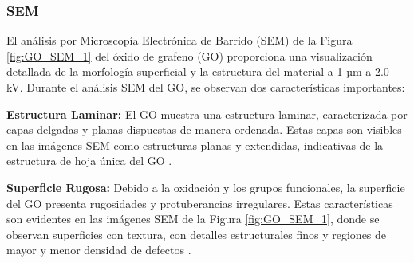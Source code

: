 \documentclass[12pt]{article}
\begin{document}
\subsubsection{SEM}
El análisis por Microscopía Electrónica de Barrido (SEM) de la Figura \ref{fig:GO_SEM_1} del óxido de grafeno (GO) proporciona una visualización detallada de la morfología superficial y la estructura del material a 1 µm a 2.0 kV. Durante el análisis SEM del GO, se observan dos características importantes:\vspace{1em} %

\textbf{Estructura Laminar:} El GO muestra una estructura laminar, caracterizada por capas delgadas y planas dispuestas de manera ordenada. Estas capas son visibles en las imágenes SEM como estructuras planas y extendidas, indicativas de la estructura de hoja única del GO \cite{IEEEreferencias:GO_GOr}.\vspace{1em} %

\textbf{Superficie Rugosa:} Debido a la oxidación y los grupos funcionales, la superficie del GO presenta rugosidades y protuberancias irregulares. Estas características son evidentes en las imágenes SEM de la Figura \ref{fig:GO_SEM_1}, donde se observan superficies con textura, con detalles estructurales finos y regiones de mayor y menor densidad de defectos \cite{IEEEreferencias:GORAMAN}.\vspace{1em} %
\end{document}
